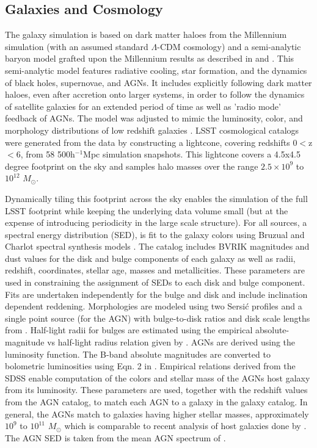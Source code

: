 \documentclass[11pt]{article}
\begin{document}
\subsection{Galaxies and Cosmology \label{sec:gal}}

The galaxy simulation is based on dark matter haloes from the
Millennium simulation \citep{springel05} (with an assumed standard
$\Lambda$-CDM cosmology) and a semi-analytic baryon model grafted upon
the Millennium results as described in \citet{springel05} and
\citet{delucia}. This semi-analytic model features radiative cooling,
star formation, and the dynamics of black holes, supernovae, and
AGNs. It includes explicitly following dark matter haloes, even after
accretion onto larger systems, in order to follow the dynamics of
satellite galaxies for an extended period of time as well as 'radio
mode' feedback of AGNs. The model was adjusted to mimic the
luminosity, color, and morphology distributions of low redshift
galaxies \citep{delucia}. LSST cosmological catalogs were generated
from the \citet{delucia} data by constructing a lightcone, covering
redshifts 0$<$z$<$6, from 58 500h$^{-1}$Mpc simulation snapshots. This
lightcone covers a 4.5x4.5 degree footprint on the sky and samples
halo masses over the range $2.5\times10^9$ to $10^{12}$ $M_\odot$.

Dynamically tiling this footprint across the sky enables the
simulation of the full LSST footprint while keeping the underlying
data volume small (but at the expense of introducing periodicity in
the large scale structure).  For all sources, a spectral energy
distribution (SED), is fit to the galaxy colors using Bruzual and
Charlot spectral synthesis models \citep{bruzual}. The \citet{delucia}
catalog includes BVRIK magnitudes and dust values for the disk and
bulge components of each galaxy as well as radii, redshift,
coordinates, stellar age, masses and metallicities. These parameters
are used in constraining the assignment of SEDs to each disk and bulge
component.  Fits are undertaken independently for the bulge and disk
and include inclination dependent reddening. Morphologies are modeled
using two Sersi{\'c} profiles and a single point source (for the AGN)
with bulge-to-disk ratios and disk scale lengths from \citet{delucia}.
Half-light radii for bulges are estimated using the empirical
absolute-magnitude vs half-light radius relation given by
\citet{gonzalez09}.  AGNs are derived using the \citet{bongiorno12}
luminosity function. The B-band absolute magnitudes are converted to
bolometric luminosities using Eqn. 2 in \citet{hopkins07}. Empirical
relations derived from the SDSS enable computation of the colors and
stellar mass of the AGNs host galaxy from its luminosity. These
parameters are used, together with the redshift values from the AGN
catalog, to match each AGN to a galaxy in the galaxy catalog. In
general, the AGNs match to galaxies having higher stellar masses,
approximately $10^{9}$ to $10^{11}$ $M_{\odot}$ which is comparable to
recent analysis of host galaxies done by \citet{xue11}. The AGN SED is
taken from the mean AGN spectrum of \citet{vandenberk}.
\end{document}
